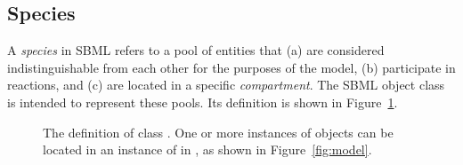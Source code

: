 \subsection{Species}
\label{sec:species}

A \emph{species} in SBML refers to a pool of entities that (a) are
considered indistinguishable from each other for the purposes of
the model, (b) participate in reactions, and (c) are located in a
specific \emph{compartment}.  The SBML \Species object class is
intended to represent these pools.  Its definition is shown in
Figure~\ref{fig:species}.

\begin{figure}[htb]
  \vspace*{-1ex}
  \centering
  \small
  \vspace*{-1ex}
  \caption{The definition of class \Species.  One or more
    instances of \Species objects can be located in an instance of
    \ListOfSpecies in \Model, as shown in
    Figure~\protect\ref{fig:model}.}
  \label{fig:species}
\end{figure}


